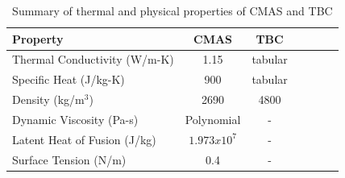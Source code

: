 \documentclass{UCF_ETD}
\begin{document}
\begin{table}
\caption{\label{tab:CMAS and TBC properties} Summary of thermal and physical properties of CMAS and TBC}
\centering
\begin{tabular}{lcccccc}
Property & CMAS& TBC\\\hline
Thermal Conductivity (W/m-K)& 1.15 \cite{Bakal2017} & tabular \cite{Han2023} \\
Specific Heat (J/kg-K)& 900 \cite{KAKUDA2015350} & tabular \cite{Han2023} \\
Density (kg/m$^3$)& 2690 \cite{BANSAL20153901}& 4800 \cite{KAKUDA20092583}\\
Dynamic Viscosity (Pa-s)& Polynomial \cite{Naraparaju2019}& -\\
Latent Heat of Fusion (J/kg)& $1.973x10^7$ \cite{Costa2019}& -\\
Surface Tension (N/m)& 0.4 \cite{Bravo2020}& -\\
\end{tabular}
\end{table}





\end{document}

